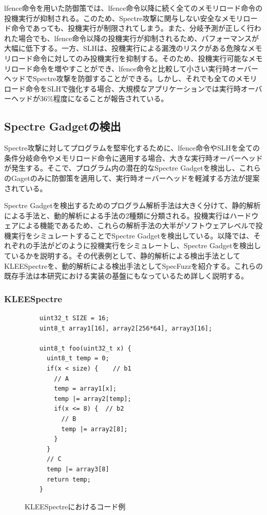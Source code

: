 lfence命令を用いた防御策では、lfence命令以降に続く全てのメモリロード命令の投機実行が抑制される。このため、Spectre攻撃に関与しない安全なメモリロード命令であっても、投機実行が制限されてしまう。また、分岐予測が正しく行われた場合でも、lfence命令以降の投機実行が抑制されるため、パフォーマンスが大幅に低下する。一方、SLHは、投機実行による漏洩のリスクがある危険なメモリロード命令に対してのみ投機実行を抑制する。そのため、投機実行可能なメモリロード命令を増やすことができ、lfence命令と比較して小さい実行時オーバーヘッドでSpectre攻撃を防御することができる。しかし、それでも全てのメモリロード命令をSLHで強化する場合、大規模なアプリケーションでは実行時オーバーヘッドが36\%程度になることが報告されている\cite{LLVM-SLH}。

\subsection{Spectre Gadgetの検出}
Spectre攻撃に対してプログラムを堅牢化するために、lfence命令やSLHを全ての条件分岐命令やメモリロード命令に適用する場合、大きな実行時オーバーヘッドが発生する。そこで、プログラム内の潜在的なSpectre Gadgetを検出し、これらのGagetのみに防御策を適用して、実行時オーバーヘッドを軽減する方法が提案されている。\par

Spectre Gadgetを検出するためのプログラム解析手法は大きく分けて、静的解析\cite{Spectre-Scanner,wang2018oo7,guarnieri2020spectector,wang2020kleespectre}による手法と、動的解析\cite{oleksenko2020specfuzz,qi2021spectaint,johannesmeyer2022kasper}による手法の2種類に分類される。投機実行はハードウェアによる機能であるため、これらの解析手法の大半がソフトウェアレベルで投機実行をシミュレートすることでSpectre Gadgetを検出している。以降では、それぞれの手法がどのように投機実行をシミュレートし、Spectre Gadgetを検出しているかを説明する。その代表例として、静的解析による検出手法としてKLEESpectre\cite{wang2020kleespectre}を、動的解析による検出手法としてSpecFuzz\cite{oleksenko2020specfuzz}を紹介する。これらの既存手法は本研究における実装の基盤にもなっているため詳しく説明する。

\subsubsection{KLEESpectre}

\begin{figure}
  \begin{verbatim}
    uint32_t SIZE = 16;
    uint8_t array1[16], array2[256*64], array3[16];

    uint8_t foo(uint32_t x) {
      uint8_t temp = 0;
      if(x < size) {    // b1
        // A
        temp = array1[x]; 
        temp |= array2[temp];
        if(x <= 8) {  // b2
          // B 
          temp |= array2[8];
        }
      }
      // C
      temp |= array3[8]
      return temp;
    }
\end{verbatim}
  \caption{KLEESpectreにおけるコード例}
  \label{klee_code}
\end{figure}

